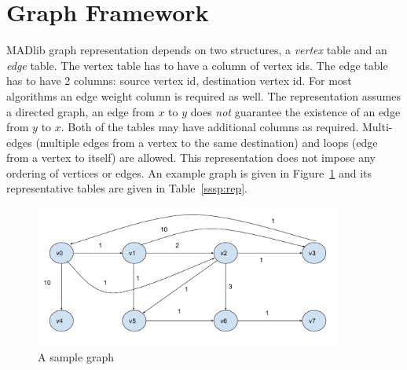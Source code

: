 \section{Graph Framework} \label{sec:graph:fw}

MADlib graph representation depends on two structures, a \emph{vertex} table
and an \emph{edge} table. The vertex table has to have a column of vertex ids.
The edge table has to have 2 columns: source vertex id, destination vertex id.
For most algorithms an edge weight column is required as well. The
representation assumes a directed graph, an edge from $x$ to $y$ does
\emph{not} guarantee the existence of an edge from $y$ to $x$. Both of the
tables may have additional columns as required. Multi-edges (multiple edges
from a vertex to the same destination) and loops (edge from a vertex to
itself) are allowed. This representation does not impose any ordering of
vertices or edges. An example graph is given in Figure~\ref{sssp:example} and
its representative tables are given in Table~\ref{sssp:rep}.

\begin{figure}[h]
	\centering
	\includegraphics[width=0.9\textwidth]{figures/graph_example.pdf}
\caption{A sample graph}
\label{sssp:example}
\end{figure}

